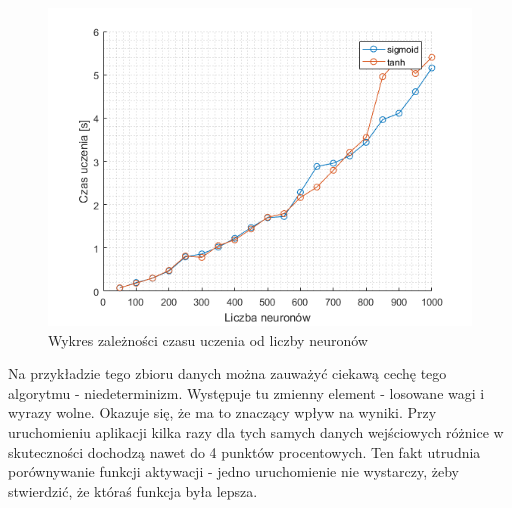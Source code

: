 \documentclass{article}
\begin{document}
\begin{figure}[H]
\centering
\includegraphics[width=\textwidth]{forest_wydajnosc.png}
\caption{Wykres zależności czasu uczenia od liczby neuronów}
\label{forest_wydajnosc}
\end{figure}

Na przykładzie tego zbioru danych można zauważyć ciekawą cechę tego algorytmu - niedeterminizm.
Występuje tu zmienny element - losowane wagi i wyrazy wolne.
Okazuje się, że ma to znaczący wpływ na wyniki.
Przy uruchomieniu aplikacji kilka razy dla tych samych danych wejściowych różnice w skuteczności dochodzą nawet do 4 punktów procentowych.
Ten fakt utrudnia porównywanie funkcji aktywacji - jedno uruchomienie nie wystarczy, żeby stwierdzić, że któraś funkcja była lepsza.
\end{document}
